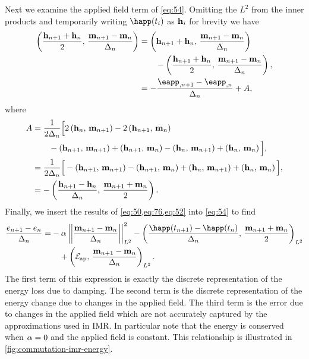 Next we examine the applied field term of \cref{eq:54}.
Omitting the $L^2$ from the inner products and temporarily writing $\happ(t_i)$ as $\boldsymbol{\mathrm{h}}_i$ for brevity we have
\begin{equation}
  \begin{aligned}
    \ip{\frac{\hv_{n+1} + \hv_n}{2}}{\mpdmdt}
    &= \ip{\hv_{n+1} + \hv_n}{\mpdmdt} \\
    & \qquad - \ip{\frac{\hv_{n+1} + \hv_n}{2}}{\mpdmdt}, \\
    &= -\frac{\eapp_{, n+1} - \eapp_{, n}}{\dtn}  + A,
    \label{eq:76}
  \end{aligned}
\end{equation}
where
\begin{equation}
  \begin{aligned}
    A &= \frac{1}{2\Delta_{n}}\Big[ 2\left(\boldsymbol{\mathrm{h}}_n,\, \boldsymbol{\mathrm{m}}_{n+1} \right) - 2\left(\boldsymbol{\mathrm{h}}_{n+1},\, \boldsymbol{\mathrm{m}}_n \right) \\
    & \qquad - \left(\boldsymbol{\mathrm{h}}_{n+1},\, \boldsymbol{\mathrm{m}}_{n+1} \right) +\left(\boldsymbol{\mathrm{h}}_{n+1},\, \boldsymbol{\mathrm{m}}_n \right)
    - \left(\boldsymbol{\mathrm{h}}_n,\, \boldsymbol{\mathrm{m}}_{n+1} \right) + \left(\boldsymbol{\mathrm{h}}_n,\, \boldsymbol{\mathrm{m}}_n \right) \Big], \\
    &= \frac{1}{2\Delta_{n}}\Big[ - \left(\boldsymbol{\mathrm{h}}_{n+1},\, \boldsymbol{\mathrm{m}}_{n+1} \right) - \left(\boldsymbol{\mathrm{h}}_{n+1},\, \boldsymbol{\mathrm{m}}_n \right)
    + \left(\boldsymbol{\mathrm{h}}_n,\, \boldsymbol{\mathrm{m}}_{n+1} \right) + \left(\boldsymbol{\mathrm{h}}_n,\, \boldsymbol{\mathrm{m}}_n \right) \Big], \\
    &= - \left( \frac{\boldsymbol{\mathrm{h}}_{n+1} - \boldsymbol{\mathrm{h}}_n}{\Delta_{n}} ,\,  \frac{\boldsymbol{\mathrm{m}}_{n+1} + \boldsymbol{\mathrm{m}}_n}{2}  \right). \\
    \label{eq:52}
  \end{aligned}
\end{equation}
Finally, we insert the results of \cref{eq:50,eq:76,eq:52} into \cref{eq:54} to find
\begin{equation}
  \begin{aligned}
    \frac{\e_{n+1} - \e_n}{\dtn} = &-\dampc \ltnorm{\mpdmdt}^2
    - \ltip{\frac{\happ(t_{n+1}) -\happ(t_n)}{\dtn}}{\frac{\mv_{n+1} + \mv_{n}}{2}} \\
    &\quad+ \ltip{\happerror}{\mpdmdt}.
    \label{eqn:imr-llg-energy}
  \end{aligned}
\end{equation}
The first term of this expression is exactly the discrete representation of the energy loss due to damping.
The second term is the discrete representation of the energy change due to changes in the applied field.
The third term is the error due to changes in the applied field which are not accurately captured by the approximations used in IMR.
In particular note that the energy is conserved when $\alpha = 0$ and the applied field is constant.
This relationship is illustrated in \cref{fig:commutation-imr-energy}.

